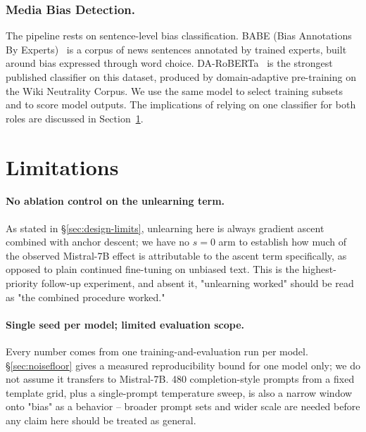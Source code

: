 \documentclass[runningheads]{llncs}
\begin{document}
\subsubsection{Media Bias Detection.}
The pipeline rests on sentence-level bias classification. BABE (Bias
Annotations By Experts)~\cite{spinde-etal-2021-neural-media} is a corpus
of news sentences annotated by trained experts, built around bias
expressed through word choice. DA-RoBERTa~\cite{krieger2022domain} is
the strongest published classifier on this dataset, produced by
domain-adaptive pre-training on the Wiki Neutrality Corpus. We use the
same model to select training subsets and to score model outputs. The
implications of relying on one classifier for both roles are discussed
in Section~\ref{sec:limitations}.



\section{Limitations}
\label{sec:limitations}

\paragraph{No ablation control on the unlearning term.} As stated in \S\ref{sec:design-limits}, unlearning here is always gradient ascent combined with anchor descent; we have no $s{=}0$ arm to establish how much of the observed Mistral-7B effect is attributable to the ascent term specifically, as opposed to plain continued fine-tuning on unbiased text. This is the highest-priority follow-up experiment, and absent it, "unlearning worked" should be read as "the combined procedure worked."

\paragraph{Single seed per model; limited evaluation scope.} Every number comes from one training-and-evaluation run per model. \S\ref{sec:noisefloor} gives a measured reproducibility bound for one model only; we do not assume it transfers to Mistral-7B. 480 completion-style prompts from a fixed template grid, plus a single-prompt temperature sweep, is also a narrow window onto "bias" as a behavior -- broader prompt sets and wider scale are needed before any claim here should be treated as general.
\end{document}
